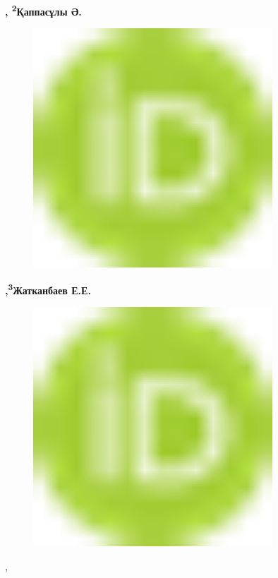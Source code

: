 {\bfseries ,
\textsuperscript{2}Қаппасұлы
Ә.}
\begin{figure}[H]
	\centering
	\includegraphics[width=0.8\textwidth]{media/chem2/image1}
	\caption*{}
\end{figure}
{\bfseries \textsuperscript{\envelope },\textsuperscript{3}Жатканбаев
Е.Е.}
\begin{figure}[H]
	\centering
	\includegraphics[width=0.8\textwidth]{media/chem2/image1}
	\caption*{}
\end{figure}
,

